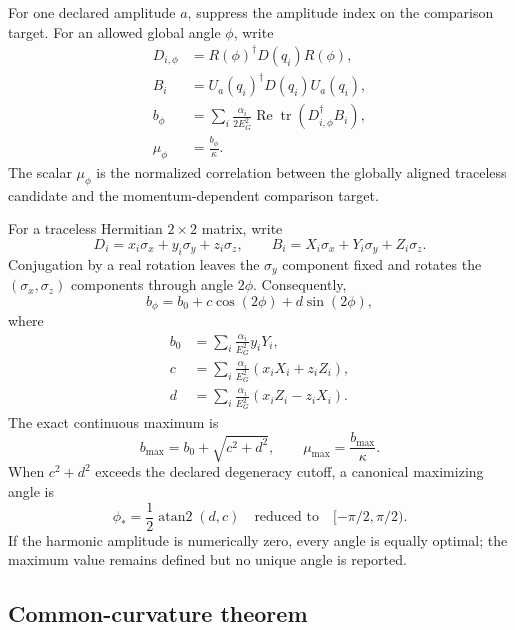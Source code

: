 \documentclass[11pt]{article}
\begin{document}
For one declared amplitude $a$, suppress the amplitude index on the comparison target.
For an allowed global angle $\phi$, write
\begin{align}
 D_{i,\phi}&=R(\phi)^\dagger D(q_i)R(\phi),\\
 B_i&=U_a(q_i)^\dagger D(q_i)U_a(q_i),\\
 b_\phi&=
 \sum_i\frac{\alpha_i}{2E_G^2}
 \operatorname{Re}\operatorname{tr}(D_{i,\phi}^\dagger B_i),\\
 \mu_\phi&=\frac{b_\phi}{\kappa}.
 \label{eq:operator-correlation}
\end{align}
The scalar $\mu_\phi$ is the normalized correlation between the globally aligned
traceless candidate and the momentum-dependent comparison target.

For a traceless Hermitian $2\times2$ matrix, write
\[
 D_i=x_i\sigma_x+y_i\sigma_y+z_i\sigma_z,
 \qquad
 B_i=X_i\sigma_x+Y_i\sigma_y+Z_i\sigma_z.
\]
Conjugation by a real rotation leaves the $\sigma_y$ component fixed and rotates the
$(\sigma_x,\sigma_z)$ components through angle $2\phi$. Consequently,
\begin{equation}
 b_\phi=b_0+c\cos(2\phi)+d\sin(2\phi),
 \label{eq:correlation-harmonic}
\end{equation}
where
\begin{align}
 b_0&=\sum_i\frac{\alpha_i}{E_G^2}y_iY_i,\\
 c&=\sum_i\frac{\alpha_i}{E_G^2}(x_iX_i+z_iZ_i),\\
 d&=\sum_i\frac{\alpha_i}{E_G^2}(x_iZ_i-z_iX_i).
 \label{eq:harmonic-coefficients}
\end{align}
The exact continuous maximum is
\begin{equation}
 b_{\max}=b_0+\sqrt{c^2+d^2},
 \qquad
 \mu_{\max}=\frac{b_{\max}}{\kappa}.
 \label{eq:continuous-correlation-maximum}
\end{equation}
When $c^2+d^2$ exceeds the declared degeneracy cutoff, a canonical maximizing angle is
\begin{equation}
 \phi_*=\frac12\operatorname{atan2}(d,c)
 \quad\text{reduced to}\quad[-\pi/2,\pi/2).
 \label{eq:continuous-maximizing-angle}
\end{equation}
If the harmonic amplitude is numerically zero, every angle is equally optimal; the
maximum value remains defined but no unique angle is reported.

\subsection{Common-curvature theorem}
\end{document}
